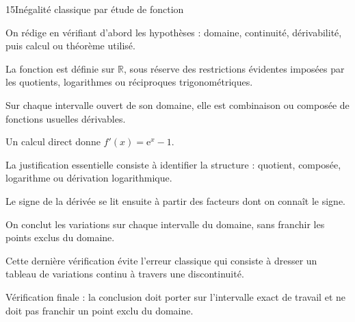 \documentclass[11pt,a4paper]{article}
\newcommand{\R}{\mathbb{R}}
\newcommand{\e}{\mathrm{e}}
\begin{document}
\begin{corrbox}{15}{Inégalité classique par étude de fonction}

\begin{methodebox}
On rédige en vérifiant d'abord les hypothèses : domaine, continuité, dérivabilité, puis calcul ou théorème utilisé.
\end{methodebox}

La fonction est définie sur $\R$, sous réserve des restrictions évidentes imposées par les quotients, logarithmes ou réciproques trigonométriques.


Sur chaque intervalle ouvert de son domaine, elle est combinaison ou composée de fonctions usuelles dérivables.


Un calcul direct donne $f'(x)=\e^x-1$.


La justification essentielle consiste à identifier la structure : quotient, composée, logarithme ou dérivation logarithmique.


Le signe de la dérivée se lit ensuite à partir des facteurs dont on connaît le signe.


On conclut les variations sur chaque intervalle du domaine, sans franchir les points exclus du domaine.


Cette dernière vérification évite l'erreur classique qui consiste à dresser un tableau de variations continu à travers une discontinuité.


\begin{attentionbox}
Vérification finale : la conclusion doit porter sur l'intervalle exact de travail et ne doit pas franchir un point exclu du domaine.
\end{attentionbox}

\end{corrbox}
\end{document}

